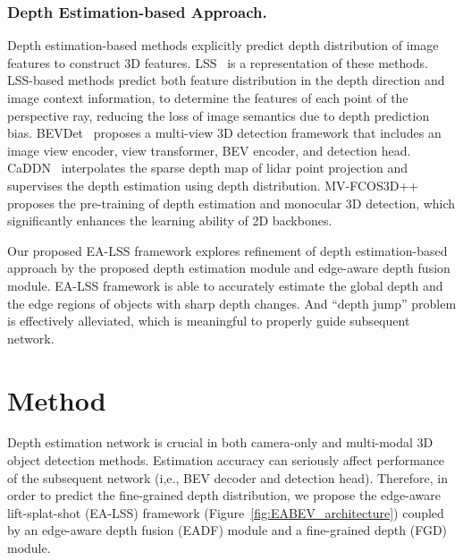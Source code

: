 \documentclass[letterpaper]{article} \usepackage[submission]{aaai24}  \usepackage{times}  \usepackage{helvet}  \usepackage{courier}  \usepackage[hyphens]{url}  \usepackage{graphicx} \urlstyle{rm} \def\UrlFont{\rm}  \usepackage{natbib}  \usepackage{caption} \frenchspacing  \setlength{\pdfpagewidth}{8.5in} \setlength{\pdfpageheight}{11in} \usepackage{algorithm}
\begin{document}
\subsubsection{Depth Estimation-based Approach.}
Depth estimation-based methods explicitly predict depth distribution of image features to construct 3D features. LSS~\cite{philion2020lss} is a representation of these methods. LSS-based methods predict both feature distribution in the depth direction and image context information, to determine the features of each point of the perspective ray, reducing the loss of image semantics due to depth prediction bias.
BEVDet~\cite{huang2021bevdet} proposes a multi-view 3D detection framework that includes an image view encoder, view transformer, BEV encoder, and detection head. CaDDN~\cite{reading2021categorical} interpolates the sparse depth map of lidar point projection and supervises the depth estimation using depth distribution. 
MV-FCOS3D++~\cite{wang2022mvfcos3d++} proposes the pre-training of depth estimation and monocular 3D detection, which significantly enhances the learning ability of 2D backbones.

Our proposed EA-LSS framework explores refinement of depth estimation-based approach by the proposed depth estimation module and edge-aware depth fusion module.
EA-LSS framework is able to accurately estimate the global depth and the edge regions of objects with sharp depth changes.  
And ``depth jump'' problem is effectively alleviated, which is meaningful to properly guide subsequent network.


\section{Method}
Depth estimation network is crucial in both camera-only and multi-modal 3D object detection methods. Estimation accuracy can seriously affect performance of the subsequent network (i,e., BEV decoder and detection head). Therefore, in order to predict the fine-grained depth distribution, we propose the edge-aware lift-splat-shot (EA-LSS) framework (Figure~\ref{fig:EABEV_architecture}) coupled by an edge-aware depth fusion (EADF) module and a fine-grained depth (FGD) module.  
\end{document}

